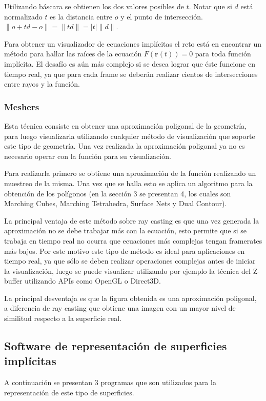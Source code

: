 \documentclass[12pt]{article}
\begin{document}
Utilizando báscara se obtienen los dos valores posibles de $t$. Notar que si $d$ está normalizado $t$ es la distancia entre $o$ y el punto de intersección. $\lVert o + td - o \rVert = \lVert td\rVert = |t|\lVert d \rVert$.

Para obtener un visualizador de ecuaciones implícitas el reto está en encontrar un método para hallar las raíces de la ecuación $F(\textbf{r}(t))=0$ para toda función implícita. El desafío es aún más complejo si se desea lograr que éste funcione en tiempo real, ya que para cada frame se deberán realizar cientos de intersecciones entre rayos y la función.  
\subsubsection{Meshers}
Esta técnica consiste en obtener una aproximación poligonal de la geometría, para luego visualizarla utilizando cualquier método de visualización que soporte este tipo de geometría. Una vez realizada la aproximación poligonal ya no es necesario operar con la función para su visualización.

Para realizarla primero se obtiene una aproximación de la función realizando un muestreo de la misma. Una vez que se halla esto se aplica un algoritmo para la obtención de los polígonos (en la sección 3 se presentan 4, los cuales son Marching Cubes, Marching Tetrahedra, Surface Nets y Dual Contour)\cite{mykola1}\cite{mykola2}.

La principal ventaja de este método sobre ray casting es que una vez generada la aproximación no se debe trabajar más con la ecuación, esto permite que si se trabaja en tiempo real no ocurra que ecuaciones más complejas tengan framerates más bajos. Por este motivo este tipo de método es ideal para aplicaciones en tiempo real, ya que sólo se deben realizar operaciones complejas antes de iniciar la visualización, luego se puede visualizar utilizando por ejemplo la técnica del Z-buffer utilizando APIs como OpenGL o Direct3D.

La principal desventaja es que la figura obtenida es una aproximación poligonal, a diferencia de ray casting que obtiene una imagen con un mayor nivel de similitud respecto a la superficie real\cite{realtimerendering}.

\subsection{Software de representación de superficies implícitas}
A continuación se presentan 3 programas que son utilizados para la representación de este tipo de superficies.
\end{document}
